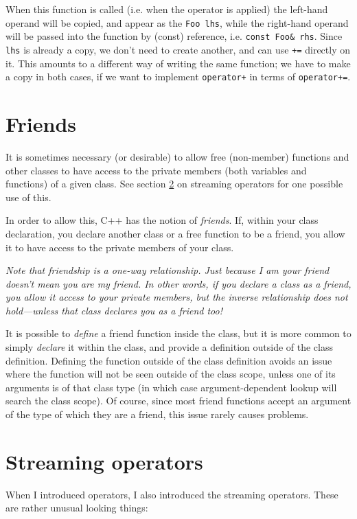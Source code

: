 \documentclass[a4paper]{scrartcl}
\begin{document}


When this function is called (i.e. when the operator is applied) the left-hand operand will be copied, and appear as the \verb|Foo lhs|, while the right-hand operand will be passed into the function by (const) reference, i.e. \verb|const Foo& rhs|. Since \verb|lhs| is already a copy, we don't need to create another, and can use \verb|+=| directly on it. This amounts to a different way of writing the same function; we have to make a copy in both cases, if we want to implement \verb|operator+| in terms of \verb|operator+=|.

\section{Friends}\label{sec:friend}
It is sometimes necessary (or desirable) to allow free (non-member) functions and other classes to have access to the private members (both variables and functions) of a given class. See section \ref{sec:streaming-operators} on streaming operators for one possible use of this.

In order to allow this, C++ has the notion of \emph{friends}. If, within your class declaration, you declare another class or a free function to be a friend, you allow it to have access to the private members of your class.

\emph{Note that friendship is a one-way relationship. Just because I am your friend doesn't mean you are my friend. In other words, if you declare a class as a friend, you allow it access to your private members, but the inverse relationship does not hold---unless that class declares you as a friend too!}

It is possible to \emph{define} a friend function inside the class, but it is more common to simply \emph{declare} it within the class, and provide a definition outside of the class definition. Defining the function outside of the class definition avoids an issue where the function will not be seen outside of the class scope, unless one of its arguments is of that class type (in which case argument-dependent lookup will search the class scope). Of course, since most friend functions accept an argument of the type of which they are a friend, this issue rarely causes problems.

\section{Streaming operators}\label{sec:streaming-operators}
When I introduced operators, I also introduced the streaming operators. These are rather unusual looking things:
\end{document}
